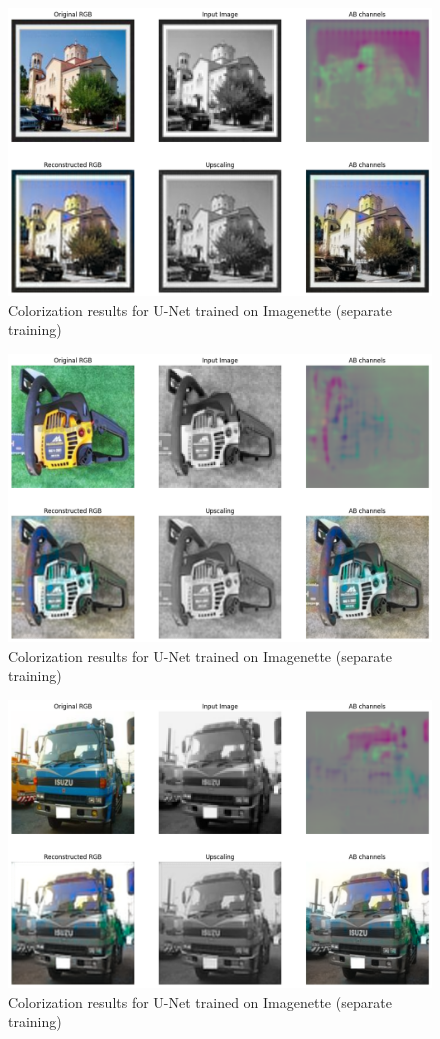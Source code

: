 \documentclass[aspectratio=169]{beamer}
\theoremstyle{definition}
\begin{document}
\begin{frame}
    \begin{figure}
        \centering
        \includegraphics[width=.75\textwidth]{demo-pipeline/building2.png}
        \caption{Colorization results for U-Net trained on Imagenette (separate training)}
    \end{figure}
\end{frame}

\begin{frame}
    \begin{figure}
        \centering
        \includegraphics[width=.75\textwidth]{demo-pipeline/chainsaw.png}
        \caption{Colorization results for U-Net trained on Imagenette (separate training)}
    \end{figure}
\end{frame}

\begin{frame}
    \begin{figure}
        \centering
        \includegraphics[width=.75\textwidth]{demo-pipeline/truc.png}
        \caption{Colorization results for U-Net trained on Imagenette (separate training)}
    \end{figure}
\end{frame}
\end{document}

